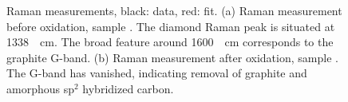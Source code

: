 		\begin{figure}
			\begin{subfigure}[tp]{0.45\linewidth}
				\caption{}\label{subfig::raman_no}
				\centering
			\end{subfigure}
			\hfill
			\begin{subfigure}[tp]{0.45\linewidth}
				\caption{}\label{subfig::raman_ox}
				\centering
			\end{subfigure}
			\caption[Raman spectrum of \nd samples]{Raman measurements, black: data, red: fit. (a) Raman measurement before oxidation, sample \insituS. The diamond Raman peak is situated at \SI{1338}{\per\centi\meter}. The broad feature around \SI{1600}{\per\centi\meter} corresponds to the graphite G-band. (b) Raman measurement after oxidation, sample \insituSo. The G-band has vanished, indicating removal of graphite and amorphous sp$^2$ hybridized carbon.}
			\label{fig::raman}
		\end{figure}

